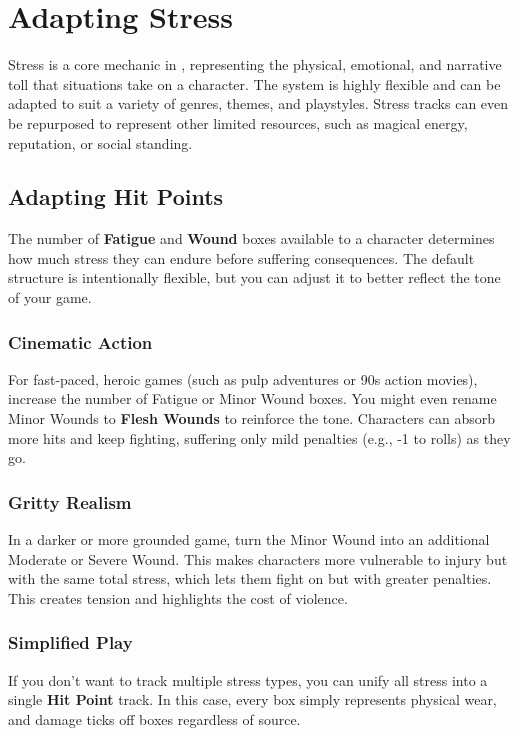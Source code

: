 \section{Adapting Stress}\label{toolbox:sec:adapting-stress}

Stress is a core mechanic in \wyrd, representing the physical, emotional, and narrative toll that situations take on a character. The system is highly flexible and can be adapted to suit a variety of genres, themes, and playstyles. Stress tracks can even be repurposed to represent other limited resources, such as magical energy, reputation, or social standing.

\subsection{Adapting Hit Points}

The number of \textbf{Fatigue} and \textbf{Wound} boxes available to a character determines how much stress they can endure before suffering consequences. The default structure is intentionally flexible, but you can adjust it to better reflect the tone of your game.

\subsubsection{Cinematic Action}
For fast-paced, heroic games (such as pulp adventures or 90s action movies), increase the number of Fatigue or Minor Wound boxes. You might even rename Minor Wounds to \textbf{Flesh Wounds} to reinforce the tone. Characters can absorb more hits and keep fighting, suffering only mild penalties (e.g., -1 to rolls) as they go.

\subsubsection{Gritty Realism}
In a darker or more grounded game, turn the Minor Wound into an additional Moderate or Severe Wound. This makes characters more vulnerable to injury but with the same total stress, which lets them fight on but with greater penalties. This creates tension and highlights the cost of violence.

\subsubsection{Simplified Play}
If you don’t want to track multiple stress types, you can unify all stress into a single \textbf{Hit Point} track. In this case, every box simply represents physical wear, and damage ticks off boxes regardless of source.

